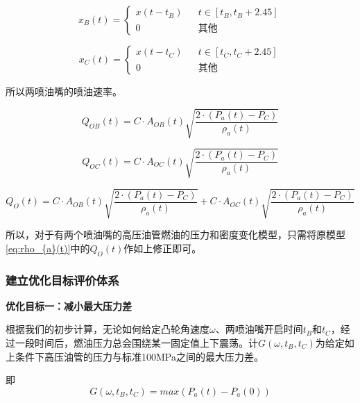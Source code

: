 \documentclass[withoutpreface,bwprint]{cumcmthesis} %
\begin{document}
\begin{equation}
x_{B}(t)=\left\{
\begin{array}{lcr}
x(t-t_{B}) & & {t \in [t_{B},t_{B}+2.45]}\\
0 & &{\text{其他}}
\end{array} \right.
\end{equation}

\begin{equation}
x_{C}(t)=\left\{
\begin{array}{lcr}
x(t-t_{C}) & & {t \in [t_{C},t_{C}+2.45]}\\
0 & &{\text{其他}}
\end{array} \right.
\end{equation}

所以两喷油嘴的喷油速率。

\begin{equation}
Q_{OB}(t)=C \cdot A_{OB}(t) \sqrt{\frac{2 \cdot (P_{a}(t)-P_{C})}{\rho_{a}(t)}}
\end{equation}

\begin{equation}
Q_{OC}(t)=C \cdot A_{OC}(t) \sqrt{\frac{2 \cdot (P_{a}(t)-P_{C})}{\rho_{a}(t)}}
\end{equation}

\begin{equation}
Q_{O}(t)=C \cdot A_{OB}(t) \sqrt{\frac{2 \cdot (P_{a}(t)-P_{C})}{\rho_{a}(t)}}+C \cdot A_{OC}(t) \sqrt{\frac{2 \cdot (P_{a}(t)-P_{C})}{\rho_{a}(t)}}
\end{equation}

所以，对于有两个喷油嘴的高压油管燃油的压力和密度变化模型，只需将原模型\cref{eq:rho_{a}(t)}中的$Q_{O}(t)$作如上修正即可。






\subsubsection{建立优化目标评价体系}

\textbf{优化目标一：减小最大压力差}

根据我们的初步计算，无论如何给定凸轮角速度$\omega$、两喷油嘴开启时间$t_{B}$和$t_{C}$，经过一段时间后，燃油压力总会围绕某一固定值上下震荡。计$G(\omega,t_{B},t_{C})$为给定如上条件下高压油管的压力与标准100MPa之间的最大压力差。

即
\begin{equation}
G(\omega,t_{B},t_{C})=max{(P_{a}(t)-P_{a}(0))} 
\end{equation}
\end{document}
